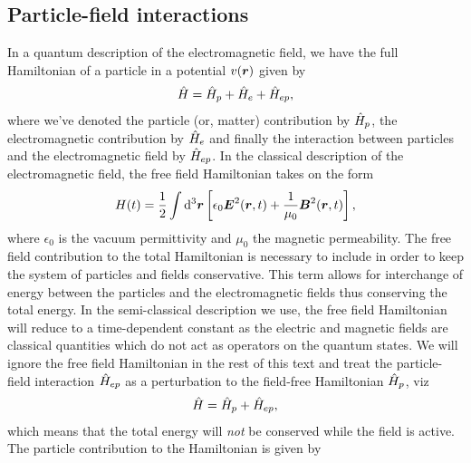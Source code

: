         \subsection{Particle-field interactions}
            In a quantum description of the electromagnetic field, we have the
            full Hamiltonian of a particle in a potential $v(\boldsymbol{r})$ given by
            \begin{align}
                \hat{H}
                = \hat{H}_{p} + \hat{H}_{e} + \hat{H}_{ep},
            \end{align}
            where we've denoted the particle (or, matter) contribution by
            $\hat{H}_p$, the electromagnetic contribution by $\hat{H}_e$ and
            finally the interaction between particles and the electromagnetic
            field by $\hat{H}_{ep}$.
            In the classical description of the electromagnetic field, the free
            field Hamiltonian takes on the form
            \begin{align}
                H(t)
                = \frac{1}{2}\int\dd^3\boldsymbol{r} \left[ 
                    \epsilon_0 \boldsymbol{E}^2(\boldsymbol{r}, t)
                    + \frac{1}{\mu_0}\boldsymbol{B}^2(\boldsymbol{r}, t)
                 \right],
            \end{align}
            where $\epsilon_0$ is the vacuum permittivity and $\mu_0$ the
            magnetic permeability.
            The free field contribution to the total Hamiltonian is necessary to
            include in order to keep the system of particles and fields
            conservative.
            This term allows for interchange of energy between the particles and
            the electromagnetic fields thus conserving the total energy.
            In the semi-classical description we use, the free field Hamiltonian
            will reduce to a time-dependent constant as the electric and
            magnetic fields are classical quantities which do not act as
            operators on the quantum states.
            We will ignore the free field Hamiltonian in the rest of this text
            and treat the particle-field interaction $\hat{H}_{ep}$ as a
            perturbation to the field-free Hamiltonian $\hat{H}_{p}$, viz
            \begin{align}
                \hat{H} = \hat{H}_{p} + \hat{H}_{ep},
                \label{eq:field-free-hamiltonian}
            \end{align}
            which means that the total energy will \emph{not} be conserved
            while the field is active.
            The particle contribution to the Hamiltonian is given by
